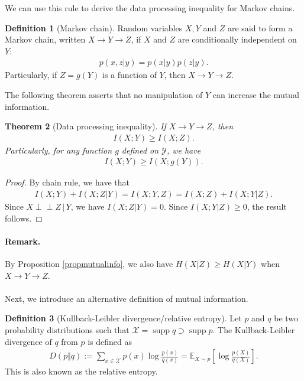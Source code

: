 \documentclass{article}
\numberwithin{equation}{section}
\newcommand{\E}{\mathbb{E}}
\newcommand{\ind}{\perp\!\!\!\perp}
\DeclareMathOperator{\supp}{supp}
\theoremstyle{plain}
\newtheorem{theorem}{Theorem}[section]
\theoremstyle{definition}
\newtheorem{definition}[theorem]{Definition}
\begin{document}
We can use this rule to derive the data processing inequality for Markov chains.
\begin{definition}[Markov chain]\label{markovchain}
Random variables $X,Y$ and $Z$ are said to form a Markov chain, written $X\to Y\to Z$, if $X$ and $Z$ are conditionally independent on $Y$:
\begin{align*}
	p(x,z|y)=p(x|y)p(z|y).
\end{align*}
Particularly, if $Z=g(Y)$ is a function of $Y$, then $X\to Y\to Z$.
\end{definition}
The following theorem asserts that no manipulation of $Y$ can increase the mutual information.
\begin{theorem}[Data processing inequality]\label{datapro}
If $X\to Y\to Z$, then
\begin{align*}
	I(X;Y)\geq I(X;Z).
\end{align*}
Particularly, for any function $g$ defined on $\mathcal{Y}$, we have
\begin{align*}
	I(X;Y)\geq I(X;g(Y)).
\end{align*}
\end{theorem}
\begin{proof}
By chain rule, we have that
\begin{align*}
	I(X;Y)+I(X;Z|Y)=I(X;Y,Z)=I(X;Z)+I(X;Y|Z).
\end{align*}
Since $X\ind Z\,|\,Y$, we have $I(X;Z|Y)=0$. Since $I(X;Y|Z)\geq 0$, the result follows.
\end{proof}
\paragraph{Remark.} By Proposition \ref{propmutualinfo}, we also have $H(X|Z)\geq H(X|Y)$ when $X\to Y\to Z$.

\paragraph{} Next, we introduce an alternative definition of mutual information.
\begin{definition}[Kullback-Leibler divergence/relative entropy]
Let $p$ and $q$ be two probability distributions such that $\mathcal{X}=\supp q\supset \supp p$. The Kullback-Leibler divergence of $q$ from $p$ is defined as
\begin{align*}
	D(p\Vert q):=\sum_{x\in\mathcal{X}}p(x)\log\frac{p(x)}{q(x)}=\E_{X\sim p}\left[\log\frac{p(X)}{q(X)}\right].
\end{align*}
This is also known as the relative entropy.
\end{definition}
\end{document}
